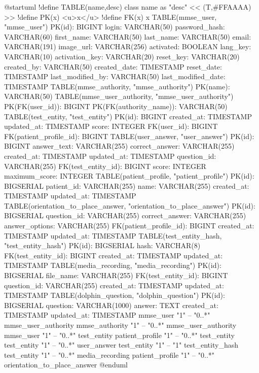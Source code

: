 @startuml
!define TABLE(name,desc) class name as "desc" << (T,#FFAAAA) >>
!define PK(x) <u>x</u>
!define FK(x) x
TABLE(mmse_user, "mmse_user") {
    PK(id): BIGINT
    login: VARCHAR(50)
    password_hash: VARCHAR(60)
    first_name: VARCHAR(50)
    last_name: VARCHAR(50)
    email: VARCHAR(191)
    image_url: VARCHAR(256)
    activated: BOOLEAN
    lang_key: VARCHAR(10)
    activation_key: VARCHAR(20)
    reset_key: VARCHAR(20)
    created_by: VARCHAR(50)
    created_date: TIMESTAMP
    reset_date: TIMESTAMP
    last_modified_by: VARCHAR(50)
    last_modified_date: TIMESTAMP
}
TABLE(mmse_authority, "mmse_authority") {
    PK(name): VARCHAR(50)
}
TABLE(mmse_user_authority, "mmse_user_authority") {
    PK(FK(user_id)): BIGINT
    PK(FK(authority_name)): VARCHAR(50)
}
TABLE(test_entity, "test_entity") {
    PK(id): BIGINT
    created_at: TIMESTAMP
    updated_at: TIMESTAMP
    score: INTEGER
    FK(user_id): BIGINT
    FK(patient_profile_id): BIGINT
}
TABLE(user_answer, "user_answer") {
    PK(id): BIGINT
    answer_text: VARCHAR(255)
    correct_answer: VARCHAR(255)
    created_at: TIMESTAMP
    updated_at: TIMESTAMP
    question_id: VARCHAR(255)
    FK(test_entity_id): BIGINT
    score: INTEGER
    maximum_score: INTEGER
}
TABLE(patient_profile, "patient_profile") {
    PK(id): BIGSERIAL
    patient_id: VARCHAR(255)
    name: VARCHAR(255)
    created_at: TIMESTAMP
    updated_at: TIMESTAMP
}
TABLE(orientation_to_place_answer, "orientation_to_place_answer") {
    PK(id): BIGSERIAL
    question_id: VARCHAR(255)
    correct_answer: VARCHAR(255)
    answer_options: VARCHAR(255)
    FK(patient_profile_id): BIGINT
    created_at: TIMESTAMP
    updated_at: TIMESTAMP
}
TABLE(test_entity_hash, "test_entity_hash") {
    PK(id): BIGSERIAL
    hash: VARCHAR(8)
    FK(test_entity_id): BIGINT
    created_at: TIMESTAMP
    updated_at: TIMESTAMP
}
TABLE(media_recording, "media_recording") {
    PK(id): BIGSERIAL
    file_name: VARCHAR(255)
    FK(test_entity_id): BIGINT
    question_id: VARCHAR(255)
    created_at: TIMESTAMP
    updated_at: TIMESTAMP
}
TABLE(dolphin_question, "dolphin_question") {
    PK(id): BIGSERIAL
    question: VARCHAR(1000)
    answer: TEXT
    created_at: TIMESTAMP
    updated_at: TIMESTAMP
}
mmse_user "1" -- "0..*" mmse_user_authority
mmse_authority "1" -- "0..*" mmse_user_authority
mmse_user "1" -- "0..*" test_entity
patient_profile "1" -- "0..*" test_entity
test_entity "1" -- "0..*" user_answer
test_entity "1" -- "1" test_entity_hash
test_entity "1" -- "0..*" media_recording
patient_profile "1" -- "0..*" orientation_to_place_answer
@enduml